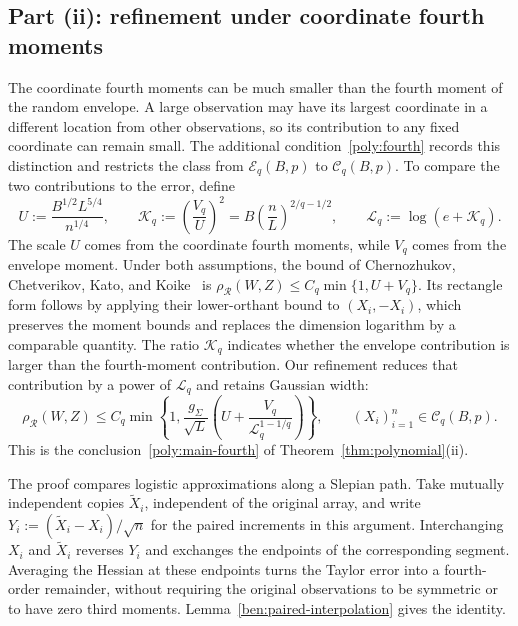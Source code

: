 \documentclass[11pt,letterpaper,twoside,leqno]{article}
\theoremstyle{bookplain}
\theoremstyle{bookremark}
\newcommand{\rh}{\rho_{\mathcal R}}
\begin{document}
\subsection{\texorpdfstring{{Part (ii): refinement under coordinate fourth moments}}{Part (ii): refinement under coordinate fourth moments}}\label{poly:bennett-sec}

The coordinate fourth moments can be much smaller than the fourth
moment of the random envelope. A large observation may have its
largest coordinate in a different location from other observations,
so its contribution to any fixed coordinate can remain small.
The additional condition~\eqref{poly:fourth} records this distinction
and restricts the class from $\mathcal E_q(B,p)$ to
$\mathcal C_q(B,p)$. To compare the two contributions to the error,
define
\begin{equation}
 U:=\frac{B^{1/2}L^{5/4}}{n^{1/4}},\qquad
 \mathcal K_q:=\left(\frac{V_q}{U}\right)^2
     =B\left(\frac nL\right)^{2/q-1/2},\qquad
 \mathcal L_q:=\log(e+\mathcal K_q).
 \label{poly:bennett-parameters}
\end{equation}
The scale $U$ comes from the coordinate fourth moments, while $V_q$
comes from the envelope moment. Under both assumptions, the bound of
Chernozhukov, Chetverikov, Kato, and
Koike~\cite[Theorem~2.5]{CCKK2022} is
$\rh(W,Z)\le C_q\min\{1,U+V_q\}$.
Its rectangle form follows by applying their lower-orthant bound to
$(X_i,-X_i)$, which preserves the moment bounds and replaces the
dimension logarithm by a comparable quantity.
The ratio $\mathcal K_q$ indicates whether the envelope contribution
is larger than the fourth-moment contribution. Our refinement reduces
that contribution by a power of $\mathcal L_q$ and retains Gaussian
width:
\begin{equation}
 \rh(W,Z)\le C_q\min\left\{1,
 \frac{g_\Sigma}{\sqrt L}
 \left(U+\frac{V_q}{\mathcal L_q^{1-1/q}}\right)\right\},
 \qquad (X_i)_{i=1}^n\in\mathcal C_q(B,p).
 \label{poly:bennett-bound}
\end{equation}
This is the conclusion~\eqref{poly:main-fourth} of
Theorem~\ref{thm:polynomial}\textup{(ii)}.

The proof compares logistic approximations along a Slepian path.
Take mutually independent copies $\widetilde X_i$, independent of
the original array, and write $Y_i:=(\widetilde X_i-X_i)/\sqrt n$
for the paired increments in this argument. Interchanging $X_i$ and
$\widetilde X_i$ reverses $Y_i$ and exchanges the endpoints of the
corresponding segment. Averaging the Hessian at these endpoints
turns the Taylor error into a fourth-order remainder, without
requiring the original observations to be symmetric or to have zero
third moments. Lemma~\ref{ben:paired-interpolation} gives the identity.
\end{document}
